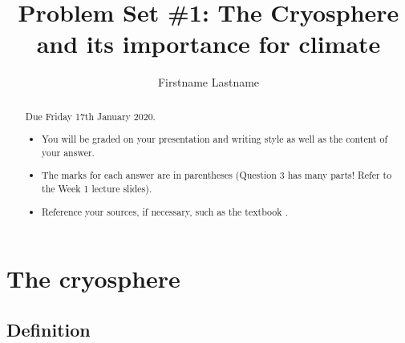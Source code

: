 \documentclass[Afour,times]{SIOpset}
\begin{document}
 

\title{Problem Set \#1: The Cryosphere and its importance for climate}

\author{Firstname Lastname}




\begin{abstract}
Due Friday 17th January 2020.
\begin{itemize}
    \item You will be graded on your presentation and writing style as well as the content of your answer.
    \item The marks for each answer are in parentheses (Question 3 has many parts! Refer to the Week 1 lecture slides).
    \item Reference your sources, if necessary, such as the textbook \citep{marshall2011cryosphere}.
\end{itemize}
\end{abstract}
 
\maketitle

\allowdisplaybreaks
\hypersetup{colorlinks=true, linkcolor=blue}

\section{The cryosphere}

\subsection{Definition}
\end{document}
